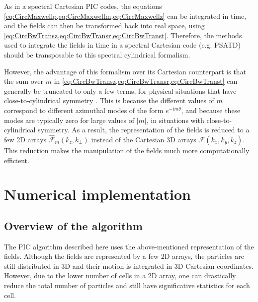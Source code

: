 \documentclass[a4paper]{article}   	%
\newcommand{\spectral}[1]{\hat{\mathcal{#1}}}
\begin{document}
As in a spectral Cartesian PIC codes, the equations
\cref{eq:CircMaxwellp,eq:CircMaxwellm,eq:CircMaxwellz}  
can be integrated in time, and the fields can then be transformed back into
real space, using \cref{eq:CircBwTransz,eq:CircBwTransr,eq:CircBwTranst}. Therefore,
the methods used to integrate the fields in time in a spectral Cartesian
code (e.g. PSATD) should be transposable to this spectral cylindrical formalism.

However, the advantage of this formalism over its Cartesian
counterpart is that the sum over $m$ in
\cref{eq:CircBwTransz,eq:CircBwTransr,eq:CircBwTranst} can generally
be truncated to only a few terms, for physical situations that have
close-to-cylindrical symmetry \citep{Lifschitz}. This is because the
different values of $m$ correspond to different azimuthal modes of the
form $e^{-im\theta}$, and because these modes are typically zero for
large values of $|m|$, in situations with close-to-cylindrical symmetry.
As a result, the representation of the fields is
reduced to a few 2D arrays $\spectral{F}_m(k_z,k_\perp )$ instead of the
Cartesian 3D arrays $\mathcal{F}(k_x,k_y,k_z)$. This reduction makes
the manipulation of the fields much more computationally efficient.

\section{Numerical implementation}
\label{sec:implementation}

\subsection{Overview of the algorithm}

The PIC algorithm described here uses the above-mentioned representation
of the fields. Although the fields are represented by a few
2D arrays, the particles are still distributed in 3D and their motion
is integrated in 3D Cartesian coordinates. However, due to the
lower number of cells in a 2D array, one can drastically reduce the
total number of particles and still have significative statistics for
each cell.
\end{document}
